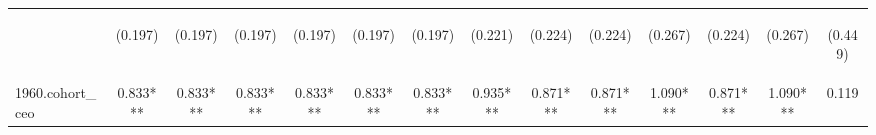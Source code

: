 \begin{center}
\begin{tabular}{lccccccccccccc}
\vspace{4pt} & \begin{footnotesize}(0.197)\end{footnotesize} & \begin{footnotesize}(0.197)\end{footnotesize} & \begin{footnotesize}(0.197)\end{footnotesize} & \begin{footnotesize}(0.197)\end{footnotesize} & \begin{footnotesize}(0.197)\end{footnotesize} & \begin{footnotesize}(0.197)\end{footnotesize} & \begin{footnotesize}(0.221)\end{footnotesize} & \begin{footnotesize}(0.224)\end{footnotesize} & \begin{footnotesize}(0.224)\end{footnotesize} & \begin{footnotesize}(0.267)\end{footnotesize} & \begin{footnotesize}(0.224)\end{footnotesize} & \begin{footnotesize}(0.267)\end{footnotesize} & \begin{footnotesize}(0.449)\end{footnotesize} \\
1960.cohort\_ceo & 0.833*** & 0.833*** & 0.833*** & 0.833*** & 0.833*** & 0.833*** & 0.935*** & 0.871*** & 0.871*** & 1.090*** & 0.871*** & 1.090*** & 0.119 \\

\end{tabular}
\end{center}
